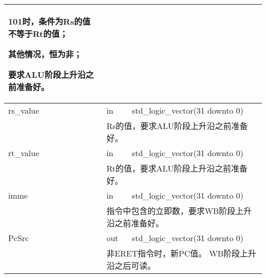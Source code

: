 \begin{tabularx}{\textwidth}{lll}
{                    101时，条件为Rs的值不等于Rt的值；

                    其他情况，恒为非；

                要求ALU阶段上升沿之前准备好。
            } \\
            \midrule
            rs\_value       & in    & std\_logic\_vector(31 downto 0) \\
            \cmidrule(l){2-3}
            &
            \multicolumn{2}{X}{
                Rs的值，要求ALU阶段上升沿之前准备好。
            } \\
            \midrule
            rt\_value       & in    & std\_logic\_vector(31 downto 0) \\
            \cmidrule(l){2-3}
            &
            \multicolumn{2}{X}{
                Rt的值，要求ALU阶段上升沿之前准备好。
            } \\
            \midrule
            imme            & in    & std\_logic\_vector(31 downto 0) \\
            \cmidrule(l){2-3}
            &
            \multicolumn{2}{X}{
                指令中包含的立即数，要求WB阶段上升沿之前准备好。
            } \\
            \midrule
            PcSrc            & out   & std\_logic\_vector(31 downto 0) \\
            \cmidrule(l){2-3}
            &
            \multicolumn{2}{X}{
                非ERET指令时，新PC值。                                                       
                WB阶段上升沿之后可读。
            } \\
                

            \bottomrule
        \end{tabularx}
